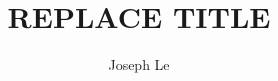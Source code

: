 \documentclass[10pt]{article}
\begin{document}
 
 
\title{REPLACE TITLE}
\author{Joseph Le}

\maketitle



\end{document}
